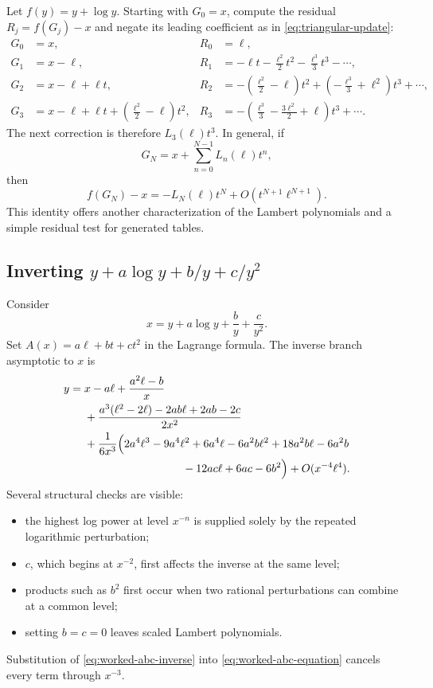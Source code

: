 \documentclass[11pt,oneside]{article}
\numberwithin{equation}{section}
\theoremstyle{definition}
\begin{document}
Let \(f(y)=y+\log y\).  Starting with \(G_0=x\), compute the residual
\(R_j=f(G_j)-x\) and negate its leading coefficient as in
\eqref{eq:triangular-update}:
\begin{align*}
 G_0&=x,
 &R_0&=\ell,\\
 G_1&=x-\ell,
 &R_1&=-\ell t-\frac{\ell^2}{2}t^2-\frac{\ell^3}{3}t^3-\cdots,\\
 G_2&=x-\ell+\ell t,
 &R_2&=-\left(\frac{\ell^2}{2}-\ell\right)t^2
      +\left(-\frac{\ell^3}{3}+\ell^2\right)t^3+\cdots,\\
 G_3&=x-\ell+\ell t+
       \left(\frac{\ell^2}{2}-\ell\right)t^2,
 &R_3&=-\left(\frac{\ell^3}{3}-\frac{3\ell^2}{2}+\ell\right)t^3
      +\cdots.
\end{align*}
The next correction is therefore \(L_3(\ell)t^3\).  In general, if
\[
  G_N=x+\sum_{n=0}^{N-1}L_n(\ell)t^n,
\]
then
\begin{equation}\label{eq:Lambert-residual-staircase}
  f(G_N)-x=-L_N(\ell)t^N+O(t^{N+1}\ell^{N+1}).
\end{equation}
This identity offers another characterization of the Lambert polynomials and a
simple residual test for generated tables.

\subsection{Inverting \(y+a\log y+b/y+c/y^2\)}

Consider
\begin{equation}\label{eq:worked-abc-equation}
  x=y+a\log y+\frac{b}{y}+\frac{c}{y^2}.
\end{equation}
Set \(A(x)=a\ell+bt+ct^2\) in the Lagrange formula.  The inverse branch
asymptotic to \(x\) is
\begin{align}
 y={}&x-a\ell
 +\frac{a^2\ell-b}{x}\nonumber\\
 &+\frac{a^3(\ell^2-2\ell)-2ab\ell+2ab-2c}{2x^2}
 \nonumber\\
 &+\frac{1}{6x^3}\Bigl(
 2a^4\ell^3-9a^4\ell^2+6a^4\ell
 -6a^2b\ell^2+18a^2b\ell-6a^2b\nonumber\\
 &\hspace{31mm}-12ac\ell+6ac-6b^2\Bigr)
 +O(x^{-4}\ell^4).
 \label{eq:worked-abc-inverse}
\end{align}
Several structural checks are visible:
\begin{itemize}
\item the highest log power at level \(x^{-n}\) is supplied solely by the
  repeated logarithmic perturbation;
\item \(c\), which begins at \(x^{-2}\), first affects the inverse at the same
  level;
\item products such as \(b^2\) first occur when two rational perturbations can
  combine at a common level;
\item setting \(b=c=0\) leaves scaled Lambert polynomials.
\end{itemize}
Substitution of \eqref{eq:worked-abc-inverse} into
\eqref{eq:worked-abc-equation} cancels every term through \(x^{-3}\).
\end{document}
